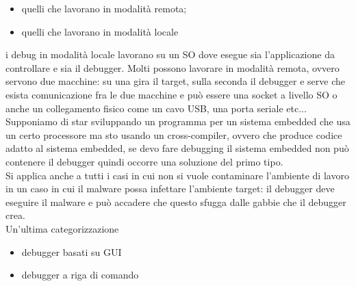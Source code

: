 \documentclass[12pt, oneside]{extbook}
\begin{document}
\begin{itemize}
\item quelli che lavorano in modalità remota;
\item quelli che lavorano in modalità locale
\end{itemize}
i debug in modalità locale lavorano su un SO dove esegue sia l'applicazione da controllare e sia il debugger. Molti possono lavorare in modalità remota, ovvero servono due macchine: su una gira il target, sulla seconda il debugger e serve che esista comunicazione fra le due macchine e può essere una socket a livello SO o anche un collegamento fisico come un cavo USB, una porta seriale etc...\\ Supponiamo di star sviluppando un programma per un sistema embedded che usa un certo processore ma sto usando un cross-compiler, ovvero che produce codice adatto al sistema embedded, se devo fare debugging il sistema embedded non può contenere il debugger quindi occorre una soluzione del primo tipo.\\ Si applica anche a tutti i casi in cui non si vuole contaminare l'ambiente di lavoro in un caso in cui il malware possa infettare l'ambiente target: il debugger deve eseguire il malware e può accadere che questo sfugga dalle gabbie che il debugger crea.\\ Un'ultima categorizzazione
\begin{itemize}
\item debugger basati su GUI
\item debugger a riga di comando
\end{itemize}
\end{document}
